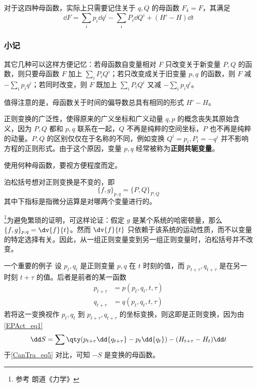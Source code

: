 对于这四种母函数，实际上只需要记住关于 $q,Q$ 的母函数 $F_4=F$，其满足
\begin{equation}
\dd F=\sum_ip_i\dd q^i-\sum_iP_i\dd Q^i+(H'-H)\dd t
\end{equation}
\subsubsection{小记}
其它几种可以这样方便记忆：若母函数自变量相对 $F$ 只改变关于新变量 $P,Q$ 的函数，则只要母函数 $F$ 加上 $\sum_iP_iQ^i$；若只改变成关于旧变量 $p,q$ 的函数，则 $F$ 减 $-\sum_ip_iq^i$；若同时改变，则 $F$ 既加上 $\sum_iP_iQ^i$ 又减 $-\sum_ip_iq^i$。

值得注意的是，母函数关于时间的偏导数总具有相同的形式 $H'-H$。

正则变换的广泛性，使得原来的广义坐标和广义动量 $q,p$ 的概念丧失其原始含义，因为 $P,Q$ 都和 $p,q$ 联系在一起，$Q$ 不再是纯粹的空间坐标，$P$ 也不再是纯粹的动量。$P,Q$ 的区别仅仅在于名称的不同，例如变换 $Q^i=p_i,P_i=-q^i$ 并不影响方程的正则形式。由于这个原因，变量 $p,q$ 经常被称为\textbf{正则共轭变量}。

使用何种母函数，要视方便程度而定。
\begin{theorem}{}
泊松括号想对正则变换是不变的，即
\begin{equation}
\{f,g\}_{p,q}=\{P,Q\}_{P,Q}
\end{equation}
其中下指标是指微分运算是对哪两个变量进行的。
\end{theorem}
\footnote{参考 朗道《力学》}为避免繁琐的证明，可这样论证：假定 $g$ 是某个系统的哈密顿量，那么 $\{f,g\}_{p,q}=\dv{f}{t}$。然而 $\dv{f}{t}$ 只依赖于该系统的运动性质，而不以变量的特定选择有关。因此，从一组正则变量变到另一组正则变量时，泊松括号并不改变。
\begin{example}{一个重要的例子}
设 $p_t,q_t$ 是正则变量 $p,q$ 在 $t$ 时刻的值，而 $p_{t+\tau},q_{t+\tau}$ 是在另一时刻 $t+\tau$ 的值。后者是前者的某一函数
\begin{equation}
\begin{aligned}
p_{t+\tau}&=p(p_t,q_t,t,\tau)\\
q_{t+\tau}&=q(p_t,q_t,t,\tau)
\end{aligned}
\end{equation}
若将这一变换视作 $p_t,q_t$ 到 $p_{t+\tau},q_{t+\tau}$ 的坐标变换，则这即是正则变换，因为由\autoref{EPAct_eq1}~
\begin{equation}
\dd S=\sum \qty(p_{t+\tau}\dd {q_{t+\tau}}-p_{t}\dd {q_{t}})-(H_{t+\tau}-H_t)\dd t
\end{equation}
于\autoref{CanTra_eq5} 对比，可知 $-S$ 是变换的母函数。 

\end{example}


